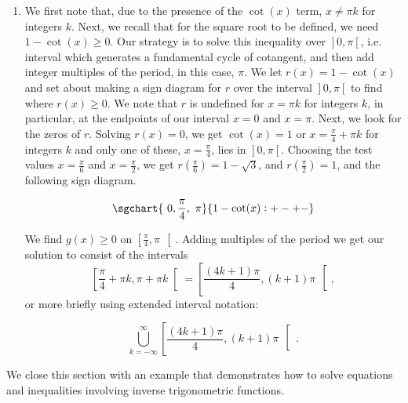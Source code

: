 \begin{example}
\begin{enumerate}
\item   We first note that, due to the presence of the $\cot(x)$ term, $x \neq \pi k$ for integers $k$.  Next, we recall that for the square root to be defined, we need $1 - \cot(x) \geq 0$.  Our strategy is to solve this inequality over $\left.\right]0,\pi\left[\right.$, i.e. interval which generates a fundamental cycle of cotangent, and then add integer multiples of the period, in this case, $\pi$.  We let $r(x) = 1 - \cot(x)$ and set about making a sign diagram for $r$ over the interval $\left.\right]0,\pi\left[\right.$ to find where $r(x) \geq 0$.  We note that $r$ is undefined for $x = \pi k$ for integers $k$, in particular, at the endpoints of our interval $x = 0$ and $x = \pi$. Next, we look for the zeros of $r$.  Solving $r(x) = 0$, we get $\cot(x) = 1$ or $x = \frac{\pi}{4} + \pi k$ for integers $k$ and only one of these, $x = \frac{\pi}{4}$, lies in $\left.\right]0,\pi\left[\right.$.   Choosing the test values $x = \frac{\pi}{6}$ and $x = \frac{\pi}{2}$, we get $r\left(\frac{\pi}{6}\right) = 1 - \sqrt{3}$, and $r\left(\frac{\pi}{2}\right) = 1$, and the following sign diagram.

$$
\sgchart{~0, \frac{\pi}{4},~\pi} {1 - \cot(x): +-+-}
$$

We find $g(x) \geq 0$ on $\left[\frac{\pi}{4}, \pi\, \right[$.  Adding multiples of the period we get our solution to consist of the intervals  $$\left[\frac{\pi}{4} + \pi k, \pi + \pi k  \right[ = \left[\frac{(4k+1)\pi}{4}, (k+1)\pi\, \right[,$$
or more briefly using extended interval notation:

\[\bigcup_{k = -\infty}^{\infty} \left[\dfrac{(4k+1)\pi}{4}, (k+1)\pi \,\right[\,.\]

\end{enumerate}
\end{example}
\fi


\ifvc
We close this section with an example that demonstrates how to solve equations and inequalities involving inverse trigonometric functions.

